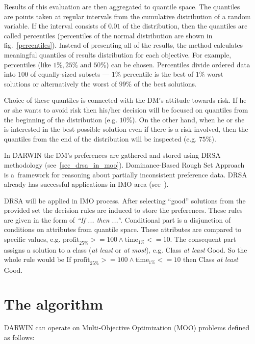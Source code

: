  Results of this evaluation are then aggregated to quantile space. The
 quantiles are points taken at regular intervals from the cumulative
 distribution of a random variable. If the interval consists of $0.01$ of the
 distribution, then the quantiles are called percentiles (percentiles of the
 normal distribution are shown in fig.~\ref{percentiles}). Instead of
 presenting all of the results, the method calculates meaningful quantiles of
 results distribution for each objective. For example, percentiles (like $1\%,
 25\%$ and $50\%$) can be chosen. Percentiles divide ordered data into 100 of
 equally-sized subsets --- $1\%$ percentile is the best of $1\%$ worst
 solutions or alternatively the worst of $99\%$ of the best solutions.

Choice of these quantiles is connected with the DM's attitude towards risk. If
he or she wants to avoid risk then his/her decision will be focused on
quantiles from the beginning of the distribution (e.g. $10\%$). On the other
hand, when he or she is interested in the best possible solution even if there
is a risk involved, then the quantiles from the end of the distribution will
be inspected (e.g. $75\%$).

In DARWIN the DM's preferences are gathered and stored using DRSA methodology
(see~\ref{sec_drsa_in_moo}). Dominance-Based Rough Set Approach is a~framework
for reasoning about partially inconsistent preference data. DRSA already has
successful applications in IMO area (see~\cite{GMS01, GMS02, GMS05}).

DRSA will be applied in IMO process. After selecting ``good'' solutions from
the provided set the decision rules are induced to store the
preferences. These rules are given in the form of \textit{``If ... then
  ...''}. Conditional part is a disjunction of conditions on attributes from
quantile space. These attributes are compared to specific values, e.g.
$\text{profit}_{25\%} >= 100 \land \text{time}_{1\%} <= 10$. The consequent
part assigns a solution to a class (\textit{at least} or \textit{at most}),
e.g. Class \textit{at least} Good. So the whole rule would be If
$\text{profit}_{25\%} >= 100 \land \text{time}_{1\%} <= 10$ then Class
\textit{at least} Good.

\section{The algorithm}
\label{idea-algo}


DARWIN can operate on Multi-Objective Optimization (MOO) problems defined as
follows:

